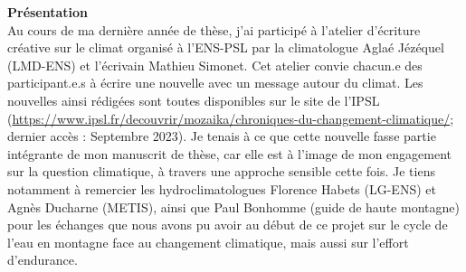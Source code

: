 
 \label{annex_nouvelle}








\newpage







\newpage


\vspace*{\fill}

{\noindent\Large\textbf{Présentation}}
\\

Au cours de ma dernière année de thèse, j'ai participé à l'atelier d'écriture créative sur le climat organisé à l'ENS-PSL par la climatologue Aglaé Jézéquel (LMD-ENS) et l'écrivain Mathieu Simonet. Cet atelier convie chacun.e des participant.e.s à écrire une nouvelle avec un message autour du climat. Les nouvelles ainsi rédigées sont toutes disponibles sur le site de l'IPSL (\url{https://www.ipsl.fr/decouvrir/mozaika/chroniques-du-changement-climatique/}; dernier accès : Septembre 2023). Je tenais à ce que cette nouvelle fasse partie intégrante de mon manuscrit de thèse, car elle est à l'image de mon engagement sur la question climatique, à travers une approche sensible cette fois. Je tiens notamment à remercier les hydroclimatologues Florence Habets (LG-ENS) et Agnès Ducharne (METIS), ainsi que Paul Bonhomme (guide de haute montagne) pour les échanges que nous avons pu avoir au début de ce projet sur le cycle de l'eau en montagne face au changement climatique, mais aussi sur l'effort d'endurance.

